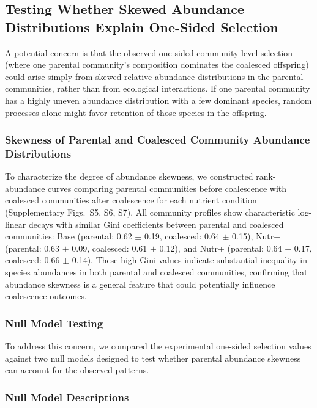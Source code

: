 
\subsection*{Testing Whether Skewed Abundance Distributions Explain One-Sided Selection}

A potential concern is that the observed one-sided community-level selection (where one parental community's composition dominates the coalesced offspring) could arise simply from skewed relative abundance distributions in the parental communities, rather than from ecological interactions. If one parental community has a highly uneven abundance distribution with a few dominant species, random processes alone might favor retention of those species in the offspring.

\subsubsection*{Skewness of Parental and Coalesced Community Abundance Distributions}

To characterize the degree of abundance skewness, we constructed rank-abundance curves comparing parental communities before coalescence with coalesced communities after coalescence for each nutrient condition (Supplementary Figs.~S5, S6, S7). All community profiles show characteristic log-linear decays with similar Gini coefficients between parental and coalesced communities: Base (parental: 0.62 $\pm$ 0.19, coalesced: 0.64 $\pm$ 0.15), Nutr$-$ (parental: 0.63 $\pm$ 0.09, coalesced: 0.61 $\pm$ 0.12), and Nutr+ (parental: 0.64 $\pm$ 0.17, coalesced: 0.66 $\pm$ 0.14). These high Gini values indicate substantial inequality in species abundances in both parental and coalesced communities, confirming that abundance skewness is a general feature that could potentially influence coalescence outcomes.

\subsubsection*{Null Model Testing}

To address this concern, we compared the experimental one-sided selection values against two null models designed to test whether parental abundance skewness can account for the observed patterns.

\subsubsection*{Null Model Descriptions}

